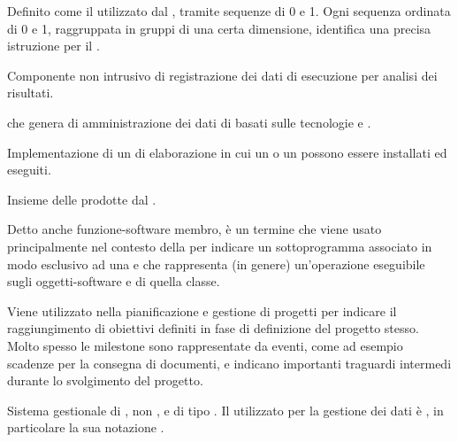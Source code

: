 {Definito come il  utilizzato dal , tramite sequenze di 0 e 1. Ogni sequenza ordinata di 0 e 1, raggruppata in gruppi di una certa dimensione, identifica una precisa istruzione per il .}


{Componente non intrusivo di registrazione dei dati di esecuzione per analisi dei risultati.}






{ che genera   di amministrazione dei dati di  basati sulle tecnologie e .}

{Implementazione  di un  di elaborazione in cui un  o un  possono essere installati ed eseguiti.}


{Insieme delle  prodotte dal  .}


{Detto anche funzione-software membro, è un termine che viene usato principalmente nel contesto della   per indicare un sottoprogramma associato in modo esclusivo ad una  e che rappresenta (in genere) un'operazione eseguibile sugli oggetti-software e  di quella classe.}


{Viene utilizzato nella pianificazione e gestione di progetti per indicare il raggiungimento di obiettivi definiti in fase di definizione del progetto stesso. Molto spesso le milestone sono rappresentate da eventi, come ad esempio scadenze per la consegna di documenti, e indicano importanti traguardi intermedi durante lo svolgimento del progetto.}


{Sistema gestionale di , non ,  e di tipo . Il  utilizzato per la gestione dei dati è , in particolare la sua notazione .}


